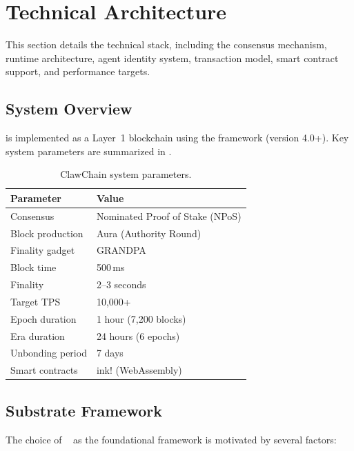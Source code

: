 
\section{Technical Architecture}
\label{sec:architecture}

This section details the \claw{} technical stack, including the consensus mechanism, runtime architecture, agent identity system, transaction model, smart contract support, and performance targets.

\subsection{System Overview}

\claw{} is implemented as a Layer~1 blockchain using the \substrate{} framework (version 4.0+). Key system parameters are summarized in .

\begin{table}[ht]
\centering
\caption{ClawChain system parameters.}
\label{tab:system-params}
\begin{tabular}{@{}ll@{}}
\toprule
\textbf{Parameter} & \textbf{Value} \\
\midrule
Consensus & Nominated Proof of Stake (NPoS) \\
Block production & Aura (Authority Round) \\
Finality gadget & GRANDPA~\citep{grandpa2020} \\
Block time & 500\,ms \\
Finality & 2--3 seconds \\
Target TPS & 10{,}000+ \\
Epoch duration & 1 hour (7{,}200 blocks) \\
Era duration & 24 hours (6 epochs) \\
Unbonding period & 7 days \\
Smart contracts & ink! (WebAssembly) \\
\bottomrule
\end{tabular}
\end{table}

\subsection{Substrate Framework}
\label{sec:substrate}

The choice of \substrate{}~\citep{substrate2023} as the foundational framework is motivated by several factors:

